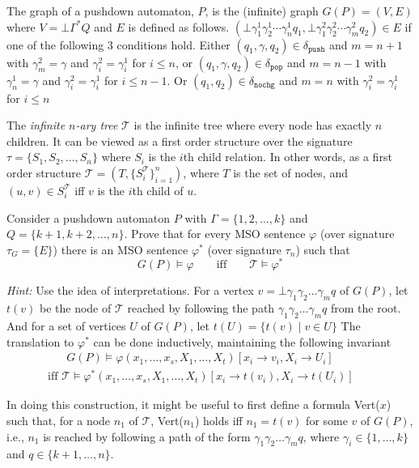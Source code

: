 \documentclass[10pt]{homework}
\begin{document}
The graph of a pushdown automaton, \(P\), is the (infinite) graph \(G(P) = (V, E)\) where \(V = \bot \Gamma^* Q\) and \(E\) is defined as follows.
\((\bot \gamma^1_1 \gamma^1_2 \cdots \gamma^1_n q_1, \bot \gamma^2_1 \gamma^2_2 \cdots \gamma^2_m q_2) \in E \) if one of the following 3 conditions hold.
Either \((q_1, \gamma, q_2) \in \delta_\mathtt{push}\) and \(m = n + 1\)
with \(\gamma^2_m = \gamma\) and \(\gamma^2_i = \gamma^1_i\) for \(i \leq n\),
or \((q_1, \gamma, q_2) \in \delta_\mathtt{pop}\) and \(m = n - 1\)
with \(\gamma^1_n = \gamma\) and \(\gamma^2_i = \gamma^1_i\) for \(i \leq n-1\).
Or \((q_1, q_2) \in \delta_\mathtt{nochg}\) and \(m = n\)
with \(\gamma^2_i = \gamma^1_i\) for \(i \leq n\)

The \emph{infinite \(n\)-ary tree} \(\mathcal{T}\) is the infinite tree where every node has exactly \(n\) children.
It can be viewed as a first order structure over the signature \(\tau = \{S_1, S_2, \dots, S_n\}\) where \(S_i\) is the \(i\)th child relation.
In other words, as a first order structure \(\mathcal{T} = (T, \{S_i^\mathcal{T}\}_{i=1}^n)\), where \(T\) is the set of nodes,
and \((u,v) \in S_i^\mathcal{T}\) iff \(v\) is the \(i\)th child of \(u\).

Consider a pushdown automaton \(P\) with \(\Gamma = \{1,2,\dots,k\}\) and
\(Q = \{k+1,k+2,\dots, n\}\).
Prove that for every MSO sentence \(\varphi\) (over signature \(\tau_G = \{E\}\))
there is an MSO sentence \(\varphi^*\) (over signature \(\tau_n\)) such that
\[
G(P) \models \varphi \qquad \text{iff} \qquad \mathcal{T} \models \varphi^*
\]

\emph{Hint:} Use the idea of interpretations.
For a vertex \(v = \bot\gamma_1\gamma_2\dots\gamma_m q\) of \(G(P)\),
let \(t(v)\) be the node of \(\mathcal{T}\) reached by following the path 
\(\gamma_1\gamma_2\dots\gamma_m q\) from the root.
And for a set of vertices \(U\) of \(G(P)\), let \(t(U) = \{t(v) \mid v\in U\}\)
The translation to \(\varphi^*\) can be done inductively,
maintaining the following invariant
\begin{multline*}
\qquad G(P) \models \varphi(x_1,\dots,x_s,X_1,\dots,X_t)[x_i \to v_i, X_i \to U_i] \\
\text{ iff }
\mathcal{T} \models \varphi^*(x_1,\dots,x_s,X_1,\dots,X_t)[x_i \to t(v_i), X_i \to t(U_i)] \qquad
\end{multline*}

In doing this construction, it might be useful to first define a formula Vert(\(x\))
such that, for a node \(n_1\) of \(\mathcal{T}\), Vert(\(n_1\)) holds iff
\(n_1 = t(v)\) for some \(v\) of \(G(P)\), i.e.,
\(n_1\) is reached by following a path of the form \(\gamma_1\gamma_2\dots\gamma_m q\),
where \(\gamma_i \in \{1,\dots,k\}\) and \(q  \in \{k + 1, \dots, n\}\).
\end{document}
